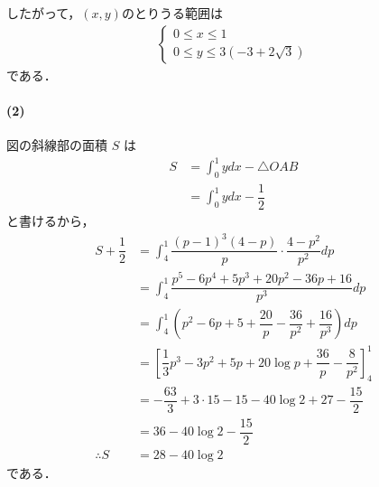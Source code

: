 \documentclass[../../main.tex]{subfiles}
\begin{document}
したがって，$(x,y)$のとりうる範囲は
\begin{align}
  \begin{cases}
    0 \le x \le 1 \\
    0 \le y \le 3(-3+2\sqrt{3})
  \end{cases}
\end{align}
である．

\paragraph{(2)}

図の斜線部の面積 $S$ は
\begin{align}
  S
  &= \int_0^1 y dx - \triangle OAB \\
  &= \int_0^1 y dx - \dfrac{1}{2}
\end{align}
と書けるから，
\begin{align}
  S + \dfrac{1}{2}
  &= \int_4^1 \dfrac{(p-1)^3(4-p)}{p} \cdot \dfrac{4-p^2}{p^2} dp \\
  &= \int_4^1 \dfrac{p^5 - 6p^4 + 5p^3 + 20p^2 - 36p + 16}{p^3} dp \\
  &= \int_4^1 \left( p^2 - 6p + 5 + \dfrac{20}{p} - \dfrac{36}{p^2} + \dfrac{16}{p^3} \right) dp \\
  &= \left[ \dfrac{1}{3}p^3 - 3p^2 + 5p + 20 \log p + \dfrac{36}{p} - \dfrac{8}{p^2} \right]_4^1 \\
  &= -\dfrac{63}{3} + 3 \cdot 15 - 15 - 40 \log 2 + 27 - \dfrac{15}{2} \\
  &= 36 - 40 \log 2 - \dfrac{15}{2} \\
  \therefore
  S & = 28 - 40 \log 2
\end{align}
である．
\end{document}
